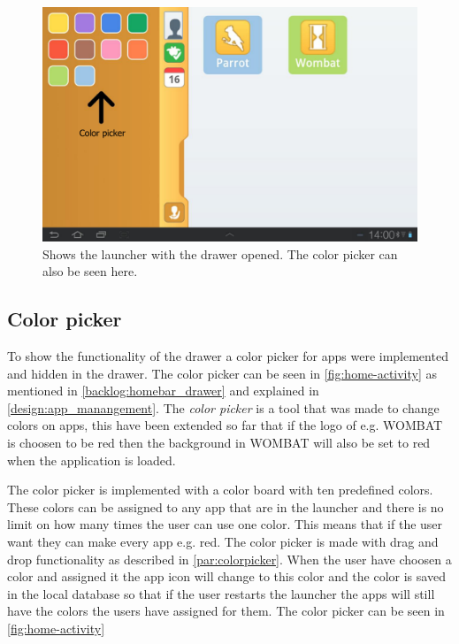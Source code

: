 \begin{figure}[h!]
	\centering
	\includegraphics[scale=0.2]{gfx/home-activity_open}
	\caption{Shows the launcher with the drawer opened. The color picker can also be seen here.}
	\label{fig:home-activity}
\end{figure}

\subsection{Color picker}
\label{home:colorpicker}

To show the functionality of the drawer a color picker for apps were implemented and hidden in the drawer. The color picker can be seen in \autoref{fig:home-activity} as mentioned in \autoref{backlog:homebar_drawer} and explained in \autoref{design:app_manangement}.
The \textit{color picker} is a tool that was made to change colors on apps, this have been extended so far that if the logo of e.g. WOMBAT is choosen to be red then the background in WOMBAT will also be set to red when the application is loaded.

The color picker is implemented with a color board with ten predefined \giraf[] colors. These colors can be assigned to any app that are in the launcher and there is no limit on how many times the user can use one color. This means that if the user want they can make every app e.g. red.
The color picker is made with drag and drop functionality as described in \autoref{par:colorpicker}. When the user have choosen a color and assigned it the app icon will change to this color and the color is saved in the local database so that if the user restarts the launcher the apps will still have the colors the users have assigned for them. 
The color picker can be seen in \autoref{fig:home-activity}

